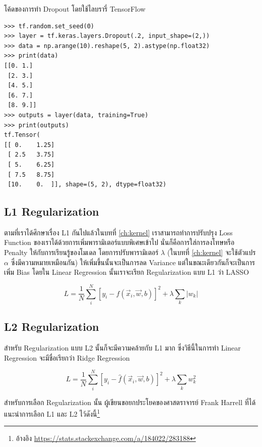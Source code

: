โค้ดของการทำ Dropout โดยใช้ไลบรารี่ TensorFlow

\begin{lstlisting}[style=MyPython]
>>> tf.random.set_seed(0)
>>> layer = tf.keras.layers.Dropout(.2, input_shape=(2,))
>>> data = np.arange(10).reshape(5, 2).astype(np.float32)
>>> print(data)
[[0. 1.]
 [2. 3.]
 [4. 5.]
 [6. 7.]
 [8. 9.]]
>>> outputs = layer(data, training=True)
>>> print(outputs)
tf.Tensor(
[[ 0.    1.25]
 [ 2.5   3.75]
 [ 5.    6.25]
 [ 7.5   8.75]
 [10.    0.  ]], shape=(5, 2), dtype=float32)
\end{lstlisting}

\subsection{L1 Regularization}
\label{ssec:l1_reg}

ตามที่เราได้ศึกษาเรื่อง L1 กันไปแล้วในบทที่ \ref{ch:kernel} เราสามารถทำการปรับปรุง Loss Function ของเราได้ด้วยการเพิ่มพารามิเตอร์แบบพิเศษเข้าไป นั่นก็คือการใส่การลงโทษหรือ Penalty ให้กับการเรียนรู้ของโมเดล โดยการปรับพารามิเตอร์ $\lambda$ (ในบทที่ \ref{ch:kernel}
จะใช้ตัวแปร $\alpha$ ซึ่งมีความหมายเหมือนกัน) ให้เพิ่มขึ้นนั้นจะเป็นการลด Variance แต่ในขณะเดียวกันก็จะเป็นการเพิ่ม Bias โดยใน 
Linear Regression นั้นเราจะเรียก Regularization แบบ L1 ว่า LASSO

\begin{equation}
    L = \frac{1}{N}\sum_i^N \left[y_i - \hat{f}(\vec{x}_i, \vec{w}, b)\right]^2 + \lambda \sum_k \left|w_k\right|
\end{equation}

\subsection{L2 Regularization}
\label{ssec:l2_reg}

สำหรับ Regularization แบบ L2 นั้นก็จะมีความคล้ายกับ L1 มาก ซึ่งวิธีนี้ในการทำ Linear Regression จะมีชื่อเรียกว่า Ridge Regression

\begin{equation}
    L = \frac{1}{N}\sum_i^N \left[y_i - \hat{f}(\vec{x}_i, \vec{w}, b)\right]^2 + \lambda \sum_k w_k^2
\end{equation}

สำหรับการเลือก Regularization นั้น ผู้เขียนขอยกประโยคของศาสตราจารย์ Frank Harrell ที่ได้แนะนำการเลือก L1 และ L2 ไว้ดังนี้\footnote{อ้างอิง \url{https://stats.stackexchange.com/a/184022/283188}}

